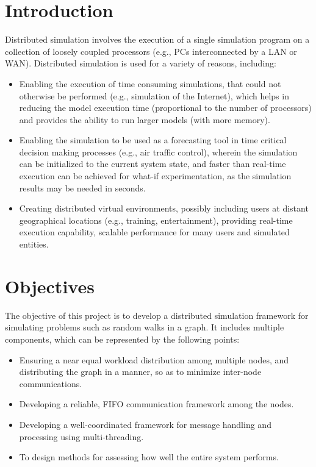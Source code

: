\documentclass[12pt,a4paper]{article}
\begin{document}
\section{Introduction}
	Distributed simulation involves the execution of a single simulation program on a collection of loosely coupled processors (e.g., PCs interconnected by a LAN or WAN). Distributed simulation is used for a variety of reasons, including:
	\begin{itemize}
		\item Enabling the execution of time consuming simulations, that could not otherwise be performed (e.g., simulation of the Internet), which helps in reducing the model execution time (proportional to the number of processors) and provides the ability to run larger models (with more memory).
		\item Enabling the simulation to be used as a forecasting tool in time critical decision making processes (e.g., air traffic control), wherein the simulation can be initialized to the current system state, and faster than real-time execution can be achieved for what-if experimentation, as the simulation results may be needed in seconds.
		\item Creating distributed virtual environments, possibly including users at distant geographical locations (e.g., training, entertainment), providing real-time execution capability, scalable performance for many users and simulated entities.
	\end{itemize}


\section{Objectives}
	The objective of this project is to develop a distributed simulation framework for simulating problems such as random walks in a graph. It includes multiple components, which can be represented by the following points:
	\begin{itemize}
		\item Ensuring a near equal workload distribution among multiple nodes, and distributing the graph in a manner, so as to minimize inter-node communications.
		\item Developing a reliable, FIFO communication framework among the nodes.
		\item Developing a well-coordinated framework for message handling and processing using multi-threading.
		\item To design methods for assessing how well the entire system performs.
	\end{itemize}
\end{document}

